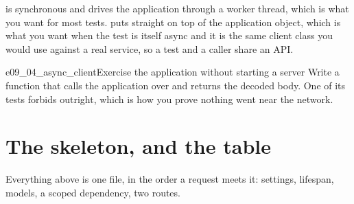 
\noindent
{} is synchronous and drives the application through a worker
thread, which is what you want for most tests.  puts
 straight on top of the application object, which is
what you want when the test is itself async \dash{} and it is the same client
class you would use against a real service, so a test and a caller share an
API.

\begin{exercise}{e09_04_async_client}{Exercise the application without starting a server}
Write a function that calls the application over  and
returns the decoded body. One of its tests forbids 
outright, which is how you prove nothing went near the network.
\end{exercise}

\section{The skeleton, and the table}
\label{sec:ch09-skeleton}

Everything above is one file, in the order a request meets it: settings,
lifespan, models, a scoped dependency, two routes.


